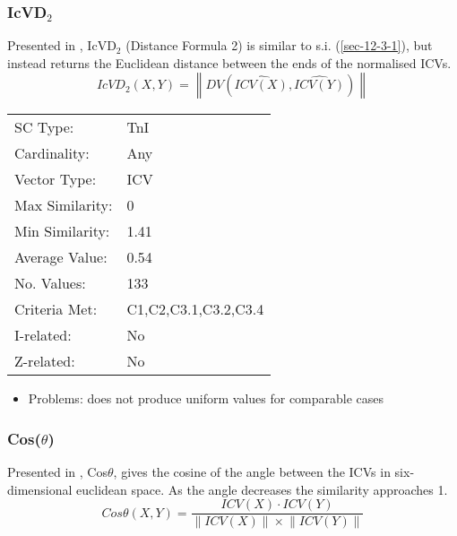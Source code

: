 \documentclass{article}
\begin{document}
\subsubsection{IcVD$_{2}$}
\label{sec-12-4-2}

Presented in \citet{Rogers1992}, IcVD$_{2}$ (Distance Formula 2) is
similar to s.i. (\ref{sec-12-3-1}), but instead returns the Euclidean distance
between the ends of the normalised ICVs.
$$IcVD_{2}(X,Y)=\left\|DV(\hat{ICV(X)},\hat{ICV(Y)})\right\|$$

\begin{center}
\begin{tabular}{ll}
 SC Type:         &  TnI                   \\
 Cardinality:     &  Any                   \\
 Vector Type:     &  ICV                   \\
 Max Similarity:  &  0                     \\
 Min Similarity:  &  1.41                  \\
 Average Value:   &  0.54                  \\
 No. Values:      &  133                   \\
 Criteria Met:    &  C1,C2,C3.1,C3.2,C3.4  \\
 I-related:       &  No                    \\
 Z-related:       &  No                    \\
\end{tabular}
\end{center}


\begin{itemize}
\item Problems: does not produce uniform values for comparable cases
\end{itemize}
\subsubsection{Cos($\theta$)}
\label{sec-12-4-3}

Presented in \citet{Rogers1992}, Cos$\theta$, gives the cosine of the
angle between the ICVs in six-dimensional euclidean space. As the
angle decreases the similarity approaches 1.
$$Cos\theta(X,Y)=\frac{ICV(X)\cdot ICV(Y)}{\left\|ICV(X)\right\|\times\left\|ICV(Y)\right\|}$$
\end{document}
